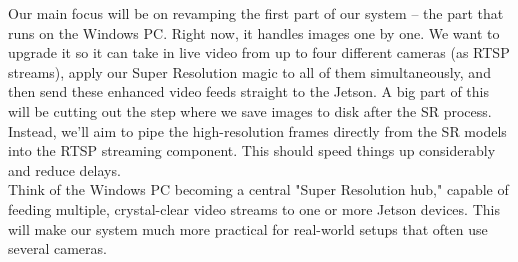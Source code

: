 Our main focus will be on revamping the first part of our system – the part that runs on the Windows PC. Right now, it handles images one by one. We want to upgrade it so it can take in live video from up to four different cameras (as RTSP streams), apply our Super Resolution magic to all of them simultaneously, and then send these enhanced video feeds straight to the Jetson. A big part of this will be cutting out the step where we save images to disk after the SR process. Instead, we'll aim to pipe the high-resolution frames directly from the SR models into the RTSP streaming component. This should speed things up considerably and reduce delays.\\
Think of the Windows PC becoming a central "Super Resolution hub," capable of feeding multiple, crystal-clear video streams to one or more Jetson devices. This will make our system much more practical for real-world setups that often use several cameras.

